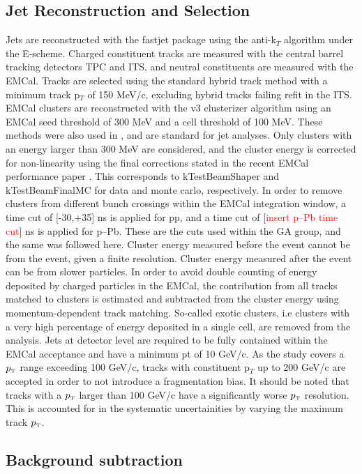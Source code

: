 \documentclass[ALICE]{ALICE_analysis_notes}
\newcommand{\pT}{$p_{\mbox{\tiny T}}$\xspace}
\newcommand{\pPb}{{\mbox{p--Pb}}\xspace}
\newcommand{\pp}{pp\xspace}
\begin{document}
\subsection{Jet Reconstruction and Selection}
\label{sec:JetRecoSel}

Jets are reconstructed with the fastjet package using the anti-k$_T$ algorithm under the E-scheme. Charged constituent tracks are measured with the central barrel tracking detectors TPC and ITS, and neutral constituents are measured with the EMCal. Tracks are selected using the standard hybrid track method with a minimum track p$_T$ of 150 MeV/c, excluding hybrid tracks failing refit in the ITS. EMCal clusters are reconstructed with the v3 clusterizer algorithm using an EMCal seed threshold of 300 MeV and a cell threshold of 100 MeV. These methods were also used in \cite{anaNoteMFasel}, and are standard for jet analyses. Only clusters with an energy larger than 300 MeV are considered, and the cluster energy is corrected for non-linearity using the final corrections stated in the recent EMCal performance paper \cite{EMCalPerformance2022}. This corresponds to kTestBeamShaper and kTestBeamFinalMC for data and monte carlo, respectively. In order to remove clusters from different bunch crossings within the EMCal integration window, a time cut of [-30,+35] ns is applied for \pp, and a time cut of [\textcolor{red}{insert \pPb time cut}] ns is applied for \pPb. These are the cuts used within the GA group, and the same was followed here. Cluster energy measured before the event cannot be from the event, given a finite resolution. Cluster energy measured after the event can be from slower particles. In order to avoid double counting of energy deposited by charged particles in the EMCal, the contribution from all tracks matched to clusters is estimated and subtracted from the cluster energy using momentum-dependent track matching. So-called exotic clusters, i.e clusters with a very high percentage of energy deposited in a single cell, are removed from the analysis. Jets at detector level are required to be fully contained within the EMCal acceptance and have a minimum pt of 10 GeV/c. As the study covers a \pT range exceeding 100 GeV/c, tracks with constituent p$_T$ up to 200 GeV/c are accepted in order to not introduce a fragmentation bias. It should be noted that tracks with a \pT larger than 100 GeV/c have a significantly worse \pT resolution. This is accounted for in the systematic uncertainities by varying the maximum track \pT.

\subsection{Background subtraction}
\label{sec:backgroundSubtraction}
\end{document}
